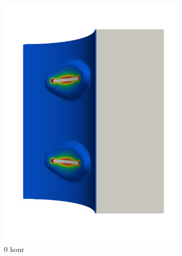 \begin{figure}[!htb]
  \begin{subfigure}[b]{0.2\textwidth}
    \centering
    \includegraphics[width=\textwidth]{Chapter5/figures/spallation/seed_ep_4}
    \caption{0 hour}
  \end{subfigure}
  \begin{subfigure}[b]{0.2\textwidth}
    \centering

\end{subfigure}
\end{figure}
